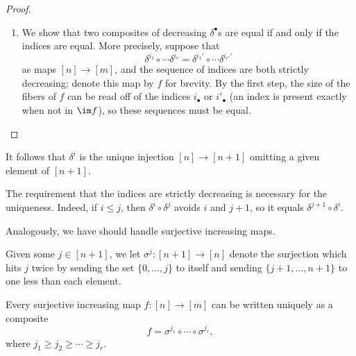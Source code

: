 \documentclass[../notes.tex]{subfiles}
\begin{document}
\begin{proof}
\begin{enumerate}
		\item We show that two composites of decreasing $\delta^\bullet$s are equal if and only if the indices are equal. More precisely, suppose that
		\[\delta^{i_1}\circ\cdots\delta^{i_r}=\delta^{i_1'}\circ\cdots\delta^{i_{r'}'}\]
		as maps $[n]\to[m]$, and the sequence of indices are both strictly decreasing; denote this map by $f$ for brevity. By the first step, the size of the fibers of $f$ can be read off of the indices $i_\bullet$ or $i'_\bullet$ (an index is present exactly when not in $\im f$), so these sequences must be equal.
		\qedhere
	\end{enumerate}
\end{proof}
\begin{remark} \label{rem:delta-relation}
	It follows that $\delta^i$ is the unique injection $[n]\to[n+1]$ omitting a given element of $[n+1]$.
\end{remark}
\begin{remark}
	The requirement that the indices are strictly decreasing is necessary for the uniqueness. Indeed, if $i\le j$, then $\delta^i\circ\delta^j$ avoids $i$ and $j+1$, so it equals $\delta^{j+1}\circ\delta^i$.
\end{remark}
Analogously, we have should handle surjective increasing maps.
\begin{notation}
	Given some $j\in[n+1]$, we let $\sigma^j\colon[n+1]\to[n]$ denote the surjection which hits $j$ twice by sending the set $\{0,\ldots,j\}$ to itself and sending $\{j+1,\ldots,n+1\}$ to one less than each element.
\end{notation}
\begin{lemma} \label{lem:classify-surj}
	Every surjective increasing map $f\colon[n]\to[m]$ can be written uniquely as a composite
	\[f=\sigma^{j_1}\circ\cdots\circ\sigma^{j_r},\]
	where $j_1\ge j_2\ge \cdots\ge j_r$.
\end{lemma}
\end{document}
